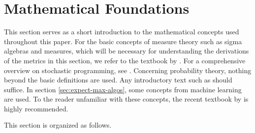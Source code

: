 \section{Mathematical Foundations}
\label{sec:math-foundations}
This section serves as a short introduction to the mathematical concepts used throughout this paper.
For the basic concepts of measure theory such as sigma algebras and measures, which will be necessary for understanding the derivations of the metrics in this section, we refer to the textbook by .
For a comprehensive overview on stochastic programming, see .
Concerning probability theory, nothing beyond the basic definitions are used.
Any introductory text such as  should suffice.
In section \ref{sec:expect-max-algos}, some concepts from machine learning are used.
To the reader unfamiliar with these concepts, the recent textbook by  is highly recommended.

This section is organized as follows. 
